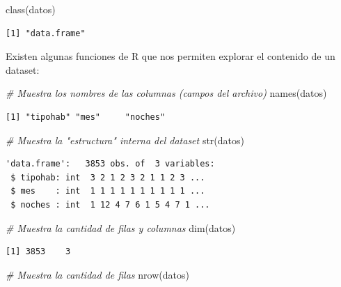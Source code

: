 \documentclass[
]{book}
\newenvironment{Shaded}{\begin{snugshade}}{\end{snugshade}}
\newcommand{\CommentTok}[1]{\textcolor[rgb]{0.56,0.35,0.01}{\textit{#1}}}
\newcommand{\FunctionTok}[1]{\textcolor[rgb]{0.00,0.00,0.00}{#1}}
\newcommand{\NormalTok}[1]{#1}
\begin{document}
\begin{Shaded}
\begin{Highlighting}[]
\FunctionTok{class}\NormalTok{(datos)}
\end{Highlighting}
\end{Shaded}

\begin{verbatim}
[1] "data.frame"
\end{verbatim}

Existen algunas funciones de R que nos permiten explorar el contenido de un dataset:

\begin{Shaded}
\begin{Highlighting}[]
\CommentTok{\# Muestra los nombres de las columnas (campos del archivo)}
\FunctionTok{names}\NormalTok{(datos)}
\end{Highlighting}
\end{Shaded}

\begin{verbatim}
[1] "tipohab" "mes"     "noches" 
\end{verbatim}

\begin{Shaded}
\begin{Highlighting}[]
\CommentTok{\# Muestra la "estructura" interna del dataset}
\FunctionTok{str}\NormalTok{(datos)}
\end{Highlighting}
\end{Shaded}

\begin{verbatim}
'data.frame':   3853 obs. of  3 variables:
 $ tipohab: int  3 2 1 2 3 2 1 1 2 3 ...
 $ mes    : int  1 1 1 1 1 1 1 1 1 1 ...
 $ noches : int  1 12 4 7 6 1 5 4 7 1 ...
\end{verbatim}

\begin{Shaded}
\begin{Highlighting}[]
\CommentTok{\# Muestra la cantidad de filas y columnas}
\FunctionTok{dim}\NormalTok{(datos)}
\end{Highlighting}
\end{Shaded}

\begin{verbatim}
[1] 3853    3
\end{verbatim}

\begin{Shaded}
\begin{Highlighting}[]
\CommentTok{\# Muestra la cantidad de filas}
\FunctionTok{nrow}\NormalTok{(datos)}
\end{Highlighting}
\end{Shaded}
\end{document}
